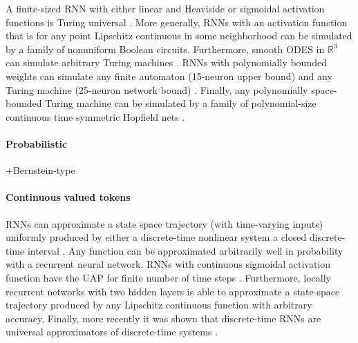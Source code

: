 \documentclass{article}
\theoremstyle{definition}
\theoremstyle{remark}
\newcommand{\reals}{\mathbb{R}}
\newcounter{ct}
\begin{document}
\citep{moore1990unpredictability,moore1998finite}

A finite-sized RNN with either linear and Heaviside or sigmoidal activation functions is Turing universal \citep{pollack1991induction, siegelmann1992computational,kilian1996universality}.
%
More generally, RNNs with an activation function that is for any point Lipschitz continuous in some neighborhood can be simulated by a family of nonuniform Boolean circuits\citep{siegelmann1994analog}.
%
Furthermore, smooth ODES in $\reals^3$ can simulate arbitrary Turing machines \citep{branicky1995universal}. %
%
RNNs with polynomially bounded weights can simulate any finite automaton (15-neuron upper bound) and any Turing machine (25-neuron network bound) \citep{indyk1995optimal}.
%
Finally, any polynomially space-bounded Turing machine can be simulated by a family of polynomial-size continuous time symmetric Hopfield nets \citep{sima2003continuous}.

\citep{cabessa2019turing}
\citep{perez2019turing}
\citep{dehghani2018universal, yun2019transformers}
\citep{chung2021turing}
\citep{perez2021attention}
\citep{giannou2023looped}
\citep{stogin2024provably}



\paragraph{Probabilistic}
 \citep{nowak2023representational, nowak2024representational}
+Bernstein-type \citep{veeravalli2023nonlinear}



\paragraph{Continuous valued tokens}
RNNs can approximate a state space trajectory (with time-varying inputs) uniformly  produced by either a discrete-time nonlinear system a closed discrete-time interval \citep{jin1995universal}.
Any function can be approximated arbitrarily well in probability with a recurrent neural network\citep{hammer2000approximation}.  %
RNNs with continuous sigmoidal activation function have the UAP for finite number of time steps \citep{schafer2006recurrent, schafer2007uap}.
Furthermore, locally recurrent networks with two hidden layers is able to approximate a state-space trajectory produced by any Lipschitz continuous function with arbitrary accuracy\citep{patan2008approximation}.
Finally, more recently it was shown that discrete-time RNNs are universal approximators of discrete-time systems \citep{aguiar2023universal}.
\end{document}
